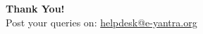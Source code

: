 \documentclass[table,10pt,red]{beamer}	%
\begin{document}




\begin{frame}
	\hskip4cm
	\textbf{\LARGE Thank You!} \\[20pt]
	\hskip3cm
	\scriptsize Post your queries on: 
	\hyperref[helpdesk@e-yantra.org]{\color{blue} helpdesk@e-yantra.org \color{black}} 
\end{frame}

\end{document}
